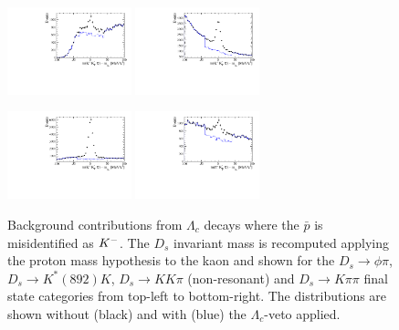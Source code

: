 \begin{figure}[h]
\centering
\includegraphics[height=!,width=0.32\textwidth]{figs/BkgStudies/norm_Ds2KKpi_as_Lc2KPpi_compareVeto_0.pdf} 
\includegraphics[height=!,width=0.32\textwidth]{figs/BkgStudies/norm_Ds2KKpi_as_Lc2KPpi_compareVeto_1.pdf}

\includegraphics[height=!,width=0.32\textwidth]{figs/BkgStudies/norm_Ds2KKpi_as_Lc2KPpi_compareVeto_2.pdf} 
\includegraphics[height=!,width=0.32\textwidth]{figs/BkgStudies/norm_Ds2Kpipi_as_Lc2piPpi_compareVeto.pdf}
\caption{Background contributions from $\Lambda_c$ decays where the $\bar p$ is misidentified as ${{K}^-}$. 
The $D_s$ invariant mass is recomputed applying the proton mass hypothesis to the kaon and shown for the 
$D_s \to \phi \pi$, $D_s \to K^*(892)K$, $D_s \to KK\pi$ (non-resonant) and $D_s \to K\pi\pi$ final state categories
from top-left to bottom-right.
The distributions are shown without (black) and with (blue) the $\Lambda_c$-veto applied.}
\label{fig:vetoLambda}
\end{figure}
